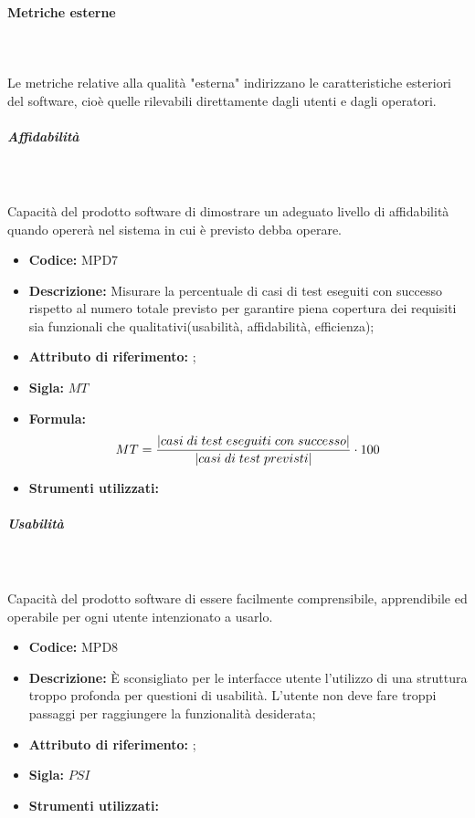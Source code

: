        
\paragraph{Metriche esterne}\mbox{}\\ \\
Le metriche relative alla qualità "esterna" indirizzano le caratteristiche esteriori del software, cioè quelle rilevabili direttamente dagli utenti e dagli operatori.

\subparagraph{Affidabilità}\mbox{}\\ \\
Capacità del prodotto software di dimostrare un adeguato livello di affidabilità quando opererà nel sistema in cui è previsto debba operare.
    
\begin{itemize}
    \item \textbf{Codice:} MPD7
    \item \textbf{Descrizione:} Misurare la percentuale di casi di test eseguiti con successo rispetto al numero totale previsto per garantire piena copertura dei requisiti sia funzionali che qualitativi(usabilità, affidabilità, efficienza);
    \item \textbf{Attributo di riferimento:} ;
    \item \textbf{Sigla:} $MT$
    \item \textbf{Formula:} $$MT = {|casi \; di \; test \; eseguiti \; con \; successo| \over |casi \; di \; test \; previsti|} \cdot 100$$
    \item \textbf{Strumenti utilizzati:}
\end{itemize}
       
\subparagraph{Usabilità}\mbox{}\\ \\
Capacità del prodotto software di essere facilmente comprensibile, apprendibile ed operabile per ogni utente intenzionato a usarlo.

\begin{itemize}
    \item \textbf{Codice:} MPD8
    \item \textbf{Descrizione:} È sconsigliato per le interfacce utente l'utilizzo di una struttura troppo profonda per questioni di usabilità. L'utente non deve fare troppi passaggi per raggiungere la funzionalità desiderata;
    \item \textbf{Attributo di riferimento:} ;
    \item \textbf{Sigla:} $PSI$
    \item \textbf{Strumenti utilizzati:}
\end{itemize}

